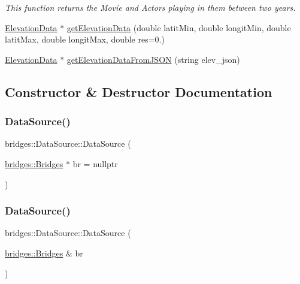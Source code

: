 \begin{DoxyCompactItemize}
\begin{DoxyCompactList}\small\item\em This function returns the Movie and Actors playing in them between two years. \end{DoxyCompactList}\item 
\hyperlink{classbridges_1_1dataset_1_1_elevation_data}{Elevation\+Data} $\ast$ \hyperlink{classbridges_1_1_data_source_a4ddc2f97700fb443448b7de57873173b}{get\+Elevation\+Data} (double latit\+Min, double longit\+Min, double latit\+Max, double longit\+Max, double res=0.)
\item 
\hyperlink{classbridges_1_1dataset_1_1_elevation_data}{Elevation\+Data} $\ast$ \hyperlink{classbridges_1_1_data_source_a31df6ed545263d74dabce76d537237e0}{get\+Elevation\+Data\+From\+J\+S\+ON} (string elev\+\_\+json)
\end{DoxyCompactItemize}


\subsection{Constructor \& Destructor Documentation}
\mbox{\label{classbridges_1_1_data_source_afc95b52d2ca03a92c1f1ee1594a097c7}} 
\subsubsection{\texorpdfstring{Data\+Source()}{DataSource()}\hspace{0.1cm}{\footnotesize\ttfamily [1/2]}}
{\footnotesize\ttfamily bridges\+::\+Data\+Source\+::\+Data\+Source (\begin{DoxyParamCaption}\item[{\hyperlink{classbridges_1_1_bridges}{bridges\+::\+Bridges} $\ast$}]{br = {\ttfamily nullptr} }\end{DoxyParamCaption})\hspace{0.3cm}{\ttfamily [inline]}}

\mbox{\label{classbridges_1_1_data_source_a0da0dc59d798aa3266df7931a396a4c9}} 
\subsubsection{\texorpdfstring{Data\+Source()}{DataSource()}\hspace{0.1cm}{\footnotesize\ttfamily [2/2]}}
{\footnotesize\ttfamily bridges\+::\+Data\+Source\+::\+Data\+Source (\begin{DoxyParamCaption}\item[{\hyperlink{classbridges_1_1_bridges}{bridges\+::\+Bridges} \&}]{br }\end{DoxyParamCaption})\hspace{0.3cm}{\ttfamily [inline]}}



